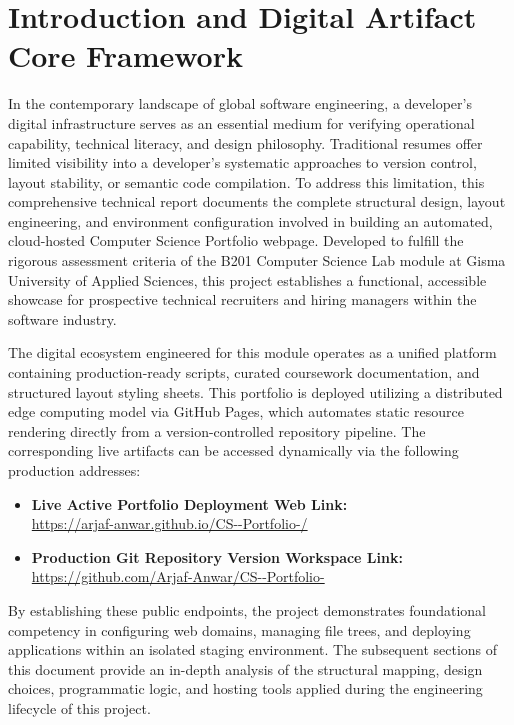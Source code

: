 \documentclass[12pt,a4paper]{article}
\begin{document}
\section{Introduction and Digital Artifact Core Framework}
In the contemporary landscape of global software engineering, a developer's digital infrastructure serves as an essential medium for verifying operational capability, technical literacy, and design philosophy. Traditional resumes offer limited visibility into a developer's systematic approaches to version control, layout stability, or semantic code compilation. To address this limitation, this comprehensive technical report documents the complete structural design, layout engineering, and environment configuration involved in building an automated, cloud-hosted Computer Science Portfolio webpage. Developed to fulfill the rigorous assessment criteria of the B201 Computer Science Lab module at Gisma University of Applied Sciences, this project establishes a functional, accessible showcase for prospective technical recruiters and hiring managers within the software industry.

The digital ecosystem engineered for this module operates as a unified platform containing production-ready scripts, curated coursework documentation, and structured layout styling sheets. This portfolio is deployed utilizing a distributed edge computing model via GitHub Pages, which automates static resource rendering directly from a version-controlled repository pipeline. The corresponding live artifacts can be accessed dynamically via the following production addresses:

\begin{itemize}
    \item \textbf{Live Active Portfolio Deployment Web Link:} \\
    \url{https://arjaf-anwar.github.io/CS--Portfolio-/}
    
    \item \textbf{Production Git Repository Version Workspace Link:} \\
    \url{https://github.com/Arjaf-Anwar/CS--Portfolio-}
\end{itemize}

By establishing these public endpoints, the project demonstrates foundational competency in configuring web domains, managing file trees, and deploying applications within an isolated staging environment. The subsequent sections of this document provide an in-depth analysis of the structural mapping, design choices, programmatic logic, and hosting tools applied during the engineering lifecycle of this project.
\end{document}
